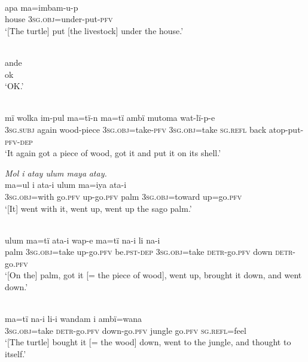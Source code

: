 \\
\gll apa  m{a=i}mbam{{}-}u-p\\
house  3\textsc{sg.obj}=under-put-\textsc{pfv}\\
\glt ‘[The turtle] put [the livestock] under the house.’

\\
\gll ande\\
ok\\
\glt ‘OK.’

\\
\gll mï      wolka  im-pul      ma=tï-n      ma=tï    ambï mutoma  wat-lï-p-e\\
3\textsc{sg.subj}  again  wood-piece  3\textsc{sg.obj}=take-\textsc{pfv}  3\textsc{sg.obj}=take  \textsc{sg.refl} back    atop-put-\textsc{pfv-dep}\\
\glt ‘It again got a piece of wood, got it and put it on its shell.’

\ex \textit{Mol i atay ulum may}{\textit{a}} \textit{atay.}\\
\gll m{a=u}l      i      ata-i    ulum  ma{=iya} ata-i\\
3\textsc{sg.obj}=with  go.\textsc{pfv}    up-go.\textsc{pfv}  palm  3\textsc{sg.obj}=toward  up=go.\textsc{pfv}\\
\glt ‘[It] went with it, went up, went up the sago palm.’

\\
\gll ulum  ma{=}tï      ata-{i} wap{{}-}e    ma{=}tï{} na{{}-i} li    n{a-i}\\
palm  3\textsc{sg.obj}{=take}  up-go.\textsc{pfv}  be.\textsc{pst-dep}  3\textsc{sg.obj}=take  \textsc{detr}{}-go.\textsc{pfv} down  \textsc{detr-}go.\textsc{pfv}\\
\glt ‘{[On the] palm, got it [= the piece of wood]}, went up, brought it down, and went down.’

\newpage

\\
\gll ma{=}tï      na{{}-i} li-i wandam  i {ambï=wana}\\
3\textsc{sg.obj}=take  \textsc{detr-}go.\textsc{pfv}  down-go.\textsc{pfv}  jungle    go.\textsc{pfv} \textsc{sg.refl=}feel\\
\glt ‘[The turtle] bought it [= the wood] down, went to the jungle, and thought to itself.’

